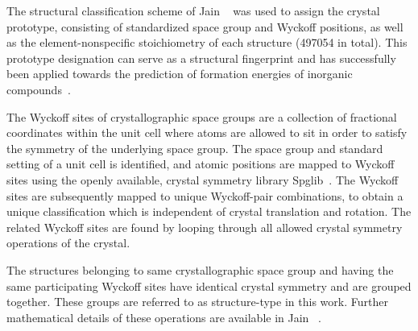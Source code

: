 %
%
The structural classification scheme of Jain ~\cite{Jain2018} was used to assign the crystal prototype,
consisting of standardized space group and Wyckoff positions,
as well as the element-nonspecific stoichiometry of each structure (\num{497054} in total).
%
This prototype designation can serve as a structural fingerprint and has successfully been applied towards the prediction of formation energies of inorganic compounds~\cite{Jain2018}.
%
%

The Wyckoff sites of crystallographic space groups are a collection of fractional coordinates within the unit cell where atoms are allowed to sit in order to satisfy the symmetry of the underlying space group.
%
The space group and standard setting of a unit cell is identified, and atomic positions are mapped to Wyckoff sites using the openly available, crystal symmetry library Spglib~\cite{spglib}. The Wyckoff sites are subsequently mapped to unique Wyckoff-pair combinations, to obtain a unique classification which is independent of crystal translation and rotation. The related Wyckoff sites are found by looping through all allowed crystal symmetry operations of the crystal.


The structures belonging to same crystallographic space group and having the same participating Wyckoff sites have identical crystal symmetry and are grouped together. These groups are referred to as structure-type in this work. Further mathematical details of these operations are available in Jain ~\cite{Jain2018}.


